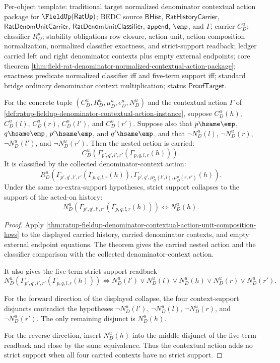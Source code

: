 Per-object template: traditional target normalized denominator contextual action
package for $\FieldUp(\mathsf{RatUp})$; BEDC source $\mathsf{BHist}$,
$\mathsf{RatHistoryCarrier}$, $\mathsf{RatDenomUnitCarrier}$,
$\mathsf{RatDenomUnitClassifier}$, $\mathsf{append}$, $\emp$, and $\Gamma$;
carrier $C_D^u$; classifier $R_D^u$; stability obligations row closure, action
unit, action composition normalization, normalized classifier exactness, and
strict-support readback; ledger carried left and right denominator contexts plus
empty external endpoints; core theorem
\autoref{thm:field-rat-denominator-normalized-contextual-action-package};
exactness predicate normalized classifier iff and five-term support iff;
standard bridge ordinary denominator context multiplication; status
$\mathsf{ProofTarget}$.

\begin{theorem}
\label{thm:ratup-fieldup-denominator-contextual-action-support-collapse}
For the concrete tuple $(C_D^u,R_D^u,\mu_D^u,e_D^u,N_D^u)$ and the contextual
action $\Gamma$ of
\autoref{def:ratup-fieldup-denominator-contextual-action-instance}, suppose
$C_D^u(h)$, $C_D^u(l)$, $C_D^u(r)$, $C_D^u(l')$, and $C_D^u(r')$. Suppose also
that $p\hsame\emp$, $q\hsame\emp$, $p'\hsame\emp$, and $q'\hsame\emp$, and that
$\neg N_D^u(l)$, $\neg N_D^u(r)$, $\neg N_D^u(l')$, and $\neg N_D^u(r')$. Then
the nested action is carried:
$$
C_D^u(\Gamma_{p',q',l',r'}(\Gamma_{p,q,l,r}(h))).
$$
It is classified by the collected denominator-context action:
$$
R_D^u(\Gamma_{p',q',l',r'}(\Gamma_{p,q,l,r}(h)),
\Gamma_{p',q',\mu_D^u(l',l),\mu_D^u(r,r')}(h)).
$$
Under the same no-extra-support hypotheses, strict support collapses to the
support of the acted-on history:
$$
N_D^u(\Gamma_{p',q',l',r'}(\Gamma_{p,q,l,r}(h)))
\Longleftrightarrow
N_D^u(h).
$$
\end{theorem}
\begin{proof}
Apply
\autoref{thm:ratup-fieldup-denominator-contextual-action-unit-composition-laws}
to the displayed carried history, carried denominator contexts, and empty
external endpoint equations. The theorem gives the carried nested action and the
classifier comparison with the collected denominator-context action.

It also gives the five-term strict-support readback
$$
N_D^u(\Gamma_{p',q',l',r'}(\Gamma_{p,q,l,r}(h)))
\Longleftrightarrow
N_D^u(l')\lor N_D^u(l)\lor N_D^u(h)\lor N_D^u(r)\lor N_D^u(r').
$$

For the forward direction of the displayed collapse, the four context-support
disjuncts contradict the hypotheses
$\neg N_D^u(l')$, $\neg N_D^u(l)$, $\neg N_D^u(r)$, and $\neg N_D^u(r')$.
The only remaining disjunct is $N_D^u(h)$.

For the reverse direction, insert $N_D^u(h)$ into the middle disjunct of the
five-term readback and close by the same equivalence. Thus the contextual action
adds no strict support when all four carried contexts have no strict support.
\end{proof}


